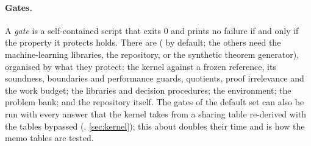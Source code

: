 \paragraph{Gates.}
A \emph{gate} is a self-contained script that exits 0 and prints no failure if and only if the property it protects holds.
There are \gatesAll{} (\gatesDefault{} by default; the others need the machine-learning libraries, the repository, or the synthetic theorem generator), organised by what they protect: the kernel against a frozen reference, its soundness, boundaries and performance guards, quotients, proof irrelevance and the work budget; the libraries and decision procedures; the environment; the problem bank; and the repository itself.
The gates of the default set can also be run with every answer that the kernel takes from a sharing table re-derived with the tables bypassed (, \cref{sec:kernel}); this about doubles their time and is how the memo tables are tested.


